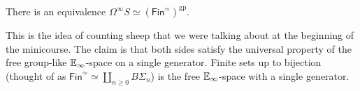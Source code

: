 \begin{theorem}\label{bpq} 
    There is an equivalence $\Omega^{\infty}S \simeq  (\mathsf{Fin} ^{\simeq })^{\mathrm{gp}}$.
\end{theorem}
This is the idea of counting sheep that we were talking about at the beginning of the minicourse. The claim is that both sides satisfy the universal property of the free group-like $\mathbb{E}_{\infty}$-space on a single generator. Finite sets up to bijection (thought of as $\mathsf{Fin}^{\simeq } \simeq \coprod_{n\geq 0}B\Sigma_n  $) is the free $\mathbb{E}_{\infty}$-space with a single generator. 
